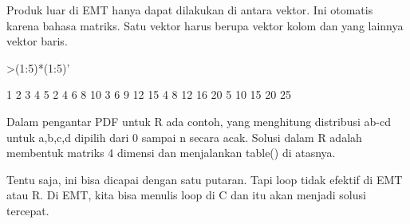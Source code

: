 \documentclass[a4paper,10pt]{article}
\begin{document}
\begin{eulernotebook}
\begin{eulercomment}
\begin{eulercomment}
\begin{eulercomment}
\begin{eulercomment}
\begin{eulercomment}
\begin{eulercomment}
\begin{eulercomment}
\begin{eulercomment}
\begin{eulercomment}
\begin{eulercomment}
\begin{eulercomment}
\begin{eulercomment}
\begin{eulercomment}
\begin{eulercomment}
\begin{eulercomment}
\begin{eulercomment}
\begin{eulercomment}
\begin{eulercomment}
\begin{eulercomment}
Produk luar di EMT hanya dapat dilakukan di antara vektor. Ini
otomatis karena bahasa matriks. Satu vektor harus berupa vektor kolom
dan yang lainnya vektor baris.
\end{eulercomment}
\begin{eulerprompt}
>(1:5)*(1:5)'
\end{eulerprompt}
\begin{euleroutput}
          1         2         3         4         5 
          2         4         6         8        10 
          3         6         9        12        15 
          4         8        12        16        20 
          5        10        15        20        25 
\end{euleroutput}
\begin{eulercomment}
Dalam pengantar PDF untuk R ada contoh, yang menghitung distribusi
ab-cd untuk a,b,c,d dipilih dari 0 sampai n secara acak. Solusi dalam
R adalah membentuk matriks 4 dimensi dan menjalankan table() di
atasnya.

Tentu saja, ini bisa dicapai dengan satu putaran. Tapi loop tidak
efektif di EMT atau R. Di EMT, kita bisa menulis loop di C dan itu
akan menjadi solusi tercepat.


\end{eulercomment}
\end{eulercomment}
\end{eulercomment}
\end{eulercomment}
\end{eulercomment}
\end{eulercomment}
\end{eulercomment}
\end{eulercomment}
\end{eulercomment}
\end{eulercomment}
\end{eulercomment}
\end{eulercomment}
\end{eulercomment}
\end{eulercomment}
\end{eulercomment}
\end{eulercomment}
\end{eulercomment}
\end{eulercomment}
\end{eulercomment}
\end{eulernotebook}
\end{document}
